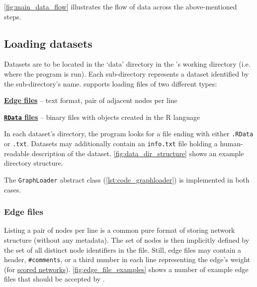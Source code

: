 \autoref{fig:main_data_flow} illustrates the flow of data across the above-mentioned steps.

\subsection{Loading datasets}



Datasets are to be located in the `data' directory in the \graffs's working directory (i.e. where the program is run).
Each sub-directory represents a dataset identified by the sub-directory's name.
\graffs supports loading files of two different types:
\begin{description}[itemsep=\zerospace]
    \item \hyperref[sec:edge_files]{\textbf{Edge files}} -- text format, pair of adjacent nodes per line
    \item \hyperref[sec:rdata_files]{\textbf{\texttt{RData} files}} -- binary files with objects created in the R language~\cite{RCoreTeamLanguageEnvironmentStatistical2009}
\end{description}

In each dataset's directory, the program looks for a file ending with either \texttt{.RData} or \texttt{.txt}.
Datasets may additionally contain an \texttt{info.txt} file holding a human-readable description of the dataset.
\autoref{fig:data_dir_structure} shows an example directory structure.

The \texttt{GraphLoader} abstract class (\autoref{lst:code_graphloader}) is implemented in both cases.


\vspace*{-0.5mm}
\subsubsection*{Edge files}\label{sec:edge_files}

Listing a pair of nodes per line is a common pure format of storing network structure (without any metadata).
The set of nodes is then implicitly defined by the set of all distinct node identifiers in the file.
Still, edge files may contain a header, \texttt{\#comments}, or a third number in each line representing the edge's weight (for \hyperref[sec:scored_networks]{scored networks}).
\autoref{fig:edge_file_examples} shows a number of example edge files that should be accepted by \graffs.

